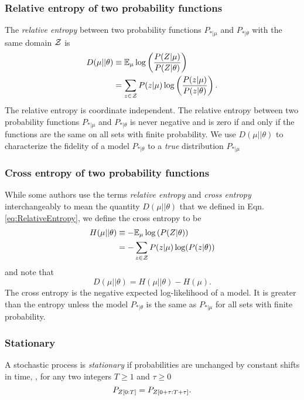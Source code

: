 \subsubsection{Relative entropy of two probability functions}
 The \emph{relative entropy} between two
probability functions $P_{*|\mu}$ and $P_{*|\theta}$ with the same
domain ${\cal Z}$ is %
\begin{align}
  \label{eq:RelativeEntropy}
  D(\mu||\theta) &\equiv \EV_{\mu} \log \left(
    \frac{P(Z|\mu)}{P(Z|\theta)} \right) \\
  &= \sum_{z \in \cal{Z}} P(z|\mu) \log\left(
  \frac{P(z|\mu)}{P(z|\theta)} \right) \nonumber.
\end{align}
The relative entropy is coordinate independent.  The relative entropy
between two probability functions $P_{*|\mu}$ and $P_{*|\theta}$ is never
negative and is zero if and only if the functions are the same on all
sets with finite probability.  We use $D(\mu||\theta)$ to
characterize the fidelity of a model $P_{*|\theta}$ to a \emph{true}
distribution $P_{*|\mu}$

\subsubsection{Cross entropy of two probability functions}
While some authors use the terms \emph{relative entropy} and
\emph{cross entropy} interchangeably to mean the quantity
$D(\mu||\theta)$ that we defined in Eqn.\eqref{eq:RelativeEntropy}, we
define the cross entropy to be
\begin{align}
  \label{eq:CrossEntropy}
  H(\mu||\theta) &\equiv -\EV_{\mu} \log \left(P(Z|\theta) \right) \\
  &= -\sum_{z \in \cal{Z}} P(z|\mu) \log(P(z|\theta)) \nonumber
\end{align}
and note that
\begin{equation*}
  D(\mu||\theta) = H(\mu||\theta) - H(\mu).
\end{equation*}
The cross entropy is the negative expected log-likelihood of a model.
It is greater than the entropy unless the model $P_{*|\theta}$ is the same
as $P_{*|\mu}$ for all sets with finite probability.

\subsubsection{Stationary}
A stochastic process is \emph{stationary} if probabilities are
unchanged by constant shifts in time, \ie, for any two integers
$T\geq 1$ and $\tau\geq 0$
\begin{equation*}
  P_{Z[0:T]} =  P_{Z[0+\tau:T+\tau]}.
\end{equation*}

